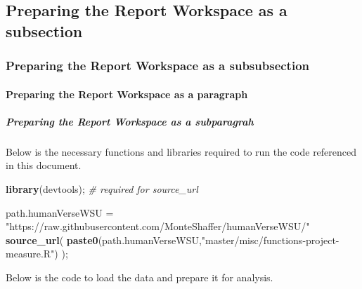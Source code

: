 \documentclass[]{article}
\newenvironment{Shaded}{\begin{snugshade}}{\end{snugshade}}
\newcommand{\CommentTok}[1]{\textcolor[rgb]{0.56,0.35,0.01}{\textit{#1}}}
\newcommand{\KeywordTok}[1]{\textcolor[rgb]{0.13,0.29,0.53}{\textbf{#1}}}
\newcommand{\NormalTok}[1]{#1}
\newcommand{\StringTok}[1]{\textcolor[rgb]{0.31,0.60,0.02}{#1}}
\begin{document}
\newpage

\subsection{Preparing the Report Workspace as a subsection}
\label{sec:appendix-setup}

\subsubsection{Preparing the Report Workspace as a subsubsection}
\label{sec:appendix-setup2}

\paragraph{Preparing the Report Workspace as a paragraph}
\label{sec:appendix-setup3}

\subparagraph{Preparing the Report Workspace as a subparagrah}
\label{sec:appendix-setup4}

Below is the necessary functions and libraries required to run the code
referenced in this document.

\begin{Shaded}
\begin{Highlighting}[]
\KeywordTok{library}\NormalTok{(devtools); }\CommentTok{# required for source_url}

\NormalTok{path.humanVerseWSU =}\StringTok{ "https://raw.githubusercontent.com/MonteShaffer/humanVerseWSU/"}
\KeywordTok{source_url}\NormalTok{( }\KeywordTok{paste0}\NormalTok{(path.humanVerseWSU,}\StringTok{"master/misc/functions-project-measure.R"}\NormalTok{) );}
\end{Highlighting}
\end{Shaded}

Below is the code to load the data and prepare it for analysis.
\end{document}
